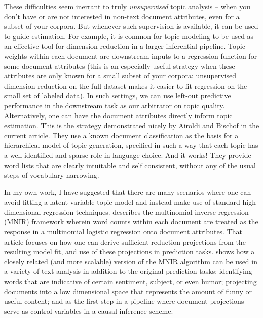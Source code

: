 \documentclass[12pt]{article}
\begin{document}
These difficulties seem inerrant to truly {\it unsupervised} topic analysis -- when you don't have or are not interested in non-text document attributes, even for a subset of your corpora.  But whenever such supervision is available, it can be used to guide estimation.  For example, it is common for topic modeling to be used as an effective tool for dimension reduction in a larger inferential pipeline.  Topic weights within each document are downstream inputs to a regression function for some document attributes (this is an especially useful strategy when these attributes are only known for a small subset of your corpora: unsupervised dimension reduction on the full dataset makes it easier to fit regression on the small set of labeled data).  In such settings, we can use left-out predictive performance in the downstream task as our arbitrator on topic quality.  Alternatively, one can have the document attributes directly inform topic estimation.  This is the strategy demonstrated nicely by Airoldi and Bischof in the current article.  They use a known document classification as the basis for a hierarchical model of topic generation, specified in such a way that each topic has a well identified and sparse role in language choice.  And it works! They provide word lists that are clearly intuitable and self consistent, without any of the usual steps of vocabulary narrowing.

In my own work, I have suggested that there are many scenarios where one can avoid  fitting a latent variable topic model and instead make use of standard high-dimensional regression techniques.  \cite{taddy_multinomial_2013} describes the multinomial inverse regression (MNIR) framework wherein word counts within each document are treated as the response in a multinomial logistic regression onto document attributes.  That article focuses on how one can derive sufficient reduction projections from the resulting model fit, and use of these projections in prediction tasks.  \cite{taddy_distributed_2015} 
shows how a closely related (and more scalable) version of the MNIR algorithm  can be used in a variety of text analysis in addition to the original prediction tasks: identifying words that are indicative of certain sentiment, subject, or even humor; projecting documents into a low dimensional space that represents the amount of funny or useful content; and as the first step in a pipeline where document projections serve as control variables in a causal inference scheme.
\end{document}
